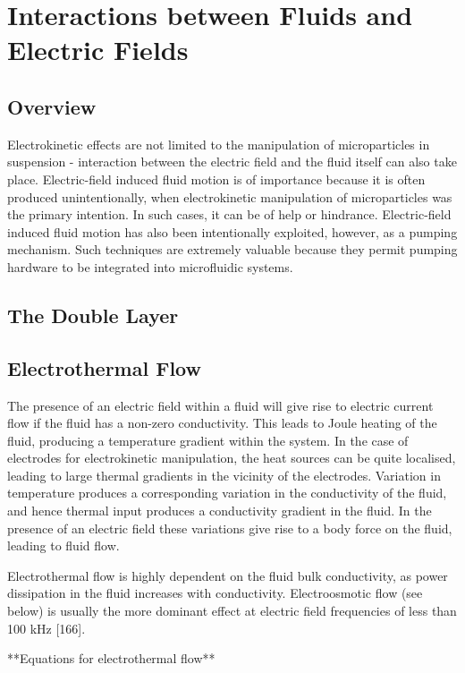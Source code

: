 \section{Interactions between Fluids and Electric Fields}
\subsection{Overview}
Electrokinetic effects are not limited to the manipulation of microparticles in suspension - interaction between the electric field and the fluid itself can also take place. Electric-field induced fluid motion is of importance because it is often produced unintentionally, when electrokinetic manipulation of microparticles was the primary intention. In such cases, it can be of help or hindrance. Electric-field induced fluid motion has also been intentionally exploited, however, as a pumping mechanism. Such techniques are extremely valuable because they permit pumping hardware to be integrated into microfluidic systems.

\subsection{The Double Layer}
\subsection{Electrothermal Flow}
The presence of an electric field within a fluid will give rise to electric current flow if the fluid has a non-zero conductivity. This leads to Joule heating of the fluid, producing a temperature gradient within the system. In the case of electrodes for electrokinetic manipulation, the heat sources can be quite localised, leading to large thermal gradients in the vicinity of the electrodes. Variation in temperature produces a corresponding variation in the conductivity of the fluid, and hence thermal input produces a conductivity gradient in the fluid. In the presence of an electric field these variations give rise to a body force on the fluid, leading to fluid flow. 

Electrothermal flow is highly dependent on the fluid bulk conductivity, as power dissipation in the fluid increases with conductivity. Electroosmotic flow (see below) is usually the more dominant effect at electric field frequencies of less than 100 kHz [166].

**Equations for electrothermal flow**


